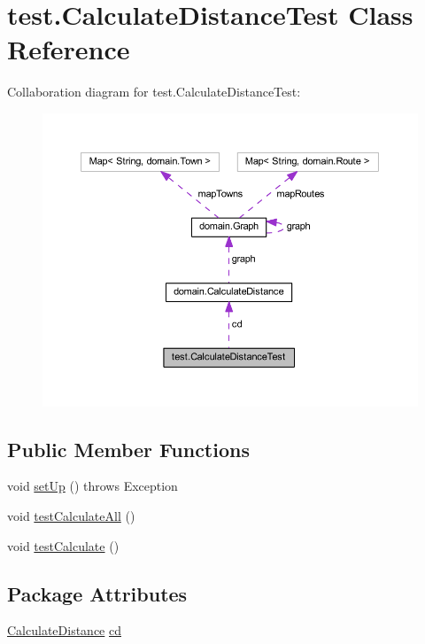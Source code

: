 \hypertarget{classtest_1_1_calculate_distance_test}{}\section{test.\+Calculate\+Distance\+Test Class Reference}
\label{classtest_1_1_calculate_distance_test}


Collaboration diagram for test.\+Calculate\+Distance\+Test\+:\nopagebreak
\begin{figure}[H]
\begin{center}
\leavevmode
\includegraphics[width=350pt]{classtest_1_1_calculate_distance_test__coll__graph}
\end{center}
\end{figure}
\subsection*{Public Member Functions}
\begin{DoxyCompactItemize}
\item 
void \hyperlink{classtest_1_1_calculate_distance_test_a6af11430659ffdfbf1f30b96b68bf642}{set\+Up} ()  throws Exception 
\item 
void \hyperlink{classtest_1_1_calculate_distance_test_ad6642d43b502c0bf9bd3876fc3303d14}{test\+Calculate\+All} ()
\item 
void \hyperlink{classtest_1_1_calculate_distance_test_ae21407ac9f926798d08a69dfdbb6fcbe}{test\+Calculate} ()
\end{DoxyCompactItemize}
\subsection*{Package Attributes}
\begin{DoxyCompactItemize}
\item 
\hyperlink{classdomain_1_1_calculate_distance}{Calculate\+Distance} \hyperlink{classtest_1_1_calculate_distance_test_aed188a5511ba8e51661627c7ec48bd00}{cd}
\end{DoxyCompactItemize}


